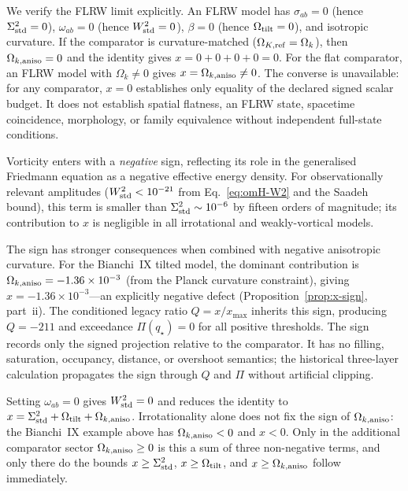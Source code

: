 \begin{remark}\label{rem:FLRW-limit}
We verify the FLRW limit explicitly.  An FLRW model has
$\sigma_{ab} = 0$ (hence $\Sigma^2_{\mathrm{std}} = 0$),
$\omega_{ab} = 0$ (hence $W^2_{\mathrm{std}} = 0$),
$\beta = 0$ (hence $\Omega_{\mathrm{tilt}} = 0$), and isotropic curvature.
If the comparator is curvature-matched ($\Omega_{K,\mathrm{ref}} = \Omega_k$),
then $\Omega_{k,\mathrm{aniso}} = 0$ and the identity gives
$x = 0 + 0 + 0 + 0 = 0$.
For the flat comparator, an FLRW model with $\Omega_k \neq 0$
gives $x = \Omega_{k,\mathrm{aniso}} \neq 0$.  The converse is unavailable:
for any comparator, $x=0$ establishes only equality of the declared
signed scalar budget.  It does not establish spatial flatness, an
FLRW state, spacetime coincidence, morphology, or family equivalence
without independent full-state conditions.
\end{remark}

\begin{remark}
\label{rem:vort-sign}
Vorticity enters with a \emph{negative} sign, reflecting its
role in the generalised Friedmann equation as a negative
effective energy density.  For observationally relevant
amplitudes ($W^2_{\mathrm{std}} < 10^{-21}$ from
Eq.~\eqref{eq:omH-W2} and the Saadeh bound), this term is
smaller than $\Sigma^2_{\mathrm{std}} \sim 10^{-6}$ by fifteen orders of
magnitude; its contribution to $x$ is negligible in all
irrotational and weakly-vortical models.

The sign has stronger consequences when combined with negative
anisotropic curvature.  For the Bianchi~IX tilted model, the
dominant contribution is $\Omega_{k,\mathrm{aniso}} = -1.36 \times 10^{-3}$
(from the Planck curvature constraint), giving $x = -1.36
\times 10^{-3}$---an explicitly negative defect
(Proposition~\ref{prop:x-sign}, part~ii).  The conditioned legacy ratio
$Q = x / x_{\max}$ inherits this sign, producing $Q = -211$
and exceedance $\Pi(q_\star) = 0$ for all positive thresholds.
The sign records only the signed projection relative to the comparator.
It has no filling, saturation, occupancy, distance, or overshoot
semantics; the historical three-layer calculation propagates the sign
through $Q$ and $\Pi$ without artificial clipping.
\end{remark}

\begin{remark}\label{rem:irrot}
Setting $\omega_{ab} = 0$ gives $W^2_{\mathrm{std}} = 0$ and reduces the
identity to $x = \Sigma^2_{\mathrm{std}} + \Omega_{\mathrm{tilt}} + \Omega_{k,\mathrm{aniso}}$.
Irrotationality alone does not fix the sign of $\Omega_{k,\mathrm{aniso}}$:
the Bianchi~IX example above has $\Omega_{k,\mathrm{aniso}}<0$ and $x<0$.
Only in the additional comparator sector $\Omega_{k,\mathrm{aniso}}\geq0$ is
this a sum of three non-negative terms, and only there do the bounds
$x \geq \Sigma^2_{\mathrm{std}}$, $x \geq \Omega_{\mathrm{tilt}}$, and $x \geq \Omega_{k,\mathrm{aniso}}$
follow immediately.
\end{remark}

